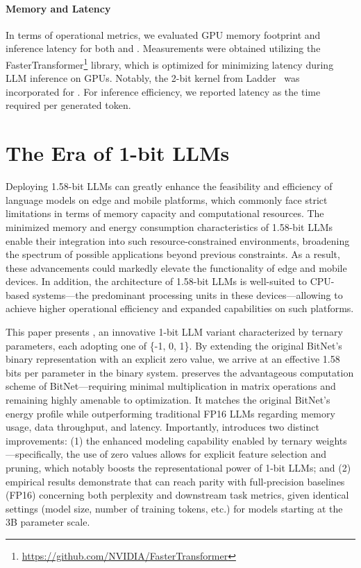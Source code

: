 \paragraph{Memory and Latency}

In terms of operational metrics, we evaluated GPU memory footprint and inference latency for both  and . Measurements were obtained utilizing the FasterTransformer\footnote{\url{https://github.com/NVIDIA/FasterTransformer}} library, which is optimized for minimizing latency during LLM inference on GPUs. Notably, the 2-bit kernel from Ladder~\cite{ladder} was incorporated for . For inference efficiency, we reported latency as the time required per generated token.

\section{The Era of 1-bit LLMs}

Deploying 1.58-bit LLMs can greatly enhance the feasibility and efficiency of language models on edge and mobile platforms, which commonly face strict limitations in terms of memory capacity and computational resources. The minimized memory and energy consumption characteristics of 1.58-bit LLMs enable their integration into such resource-constrained environments, broadening the spectrum of possible applications beyond previous constraints. As a result, these advancements could markedly elevate the functionality of edge and mobile devices. In addition, the architecture of 1.58-bit LLMs is well-suited to CPU-based systems—the predominant processing units in these devices—allowing  to achieve higher operational efficiency and expanded capabilities on such platforms.

This paper presents \textbf{}, an innovative 1-bit LLM variant characterized by ternary parameters, each adopting one of \{-1, 0, 1\}. By extending the original BitNet’s binary representation with an explicit zero value, we arrive at an effective 1.58 bits per parameter in the binary system.  preserves the advantageous computation scheme of BitNet—requiring minimal multiplication in matrix operations and remaining highly amenable to optimization. It matches the original BitNet’s energy profile while outperforming traditional FP16 LLMs regarding memory usage, data throughput, and latency. Importantly,  introduces two distinct improvements: (1) the enhanced modeling capability enabled by ternary weights—specifically, the use of zero values allows for explicit feature selection and pruning, which notably boosts the representational power of 1-bit LLMs; and (2) empirical results demonstrate that  can reach parity with full-precision baselines (FP16) concerning both perplexity and downstream task metrics, given identical settings (model size, number of training tokens, etc.) for models starting at the 3B parameter scale.


